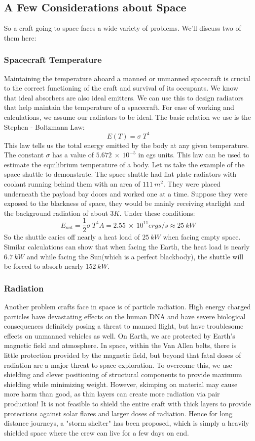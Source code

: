 \documentclass[12pt, letterpaper]{article}
\begin{document}
\subsection{A Few Considerations about Space}
So a craft going to space faces a wide variety of problems. We'll discuss two of them here:

\subsubsection{Spacecraft Temperature}
Maintaining the temperature aboard a manned or unmanned spacecraft is crucial to the correct functioning of the craft and survival of its occupants. We know that ideal absorbers are also ideal emitters. We can use this to design radiators that help maintain the temperature of a spacecraft. For ease of working and calculations, we assume our radiators to be ideal. The basic relation we use is the Stephen - Boltzmann Law:
\[
	E(T) = \sigma \:T^4 
\]
This law tells us the total energy emitted by the body at any given temperature. The constant $\sigma$ has a value of $5.672 \: \times \: 10^{-5} $ in cgs units. This law can be used to estimate the equilibrium temperature of a body. Let us take the example of the space shuttle to demonstrate. The space shuttle had flat plate radiators with coolant running behind them with an area of $111\: m^2$.
They were placed underneath the payload bay doors and worked one at a time. Suppose they were exposed to the blackness of space, they would be mainly receiving starlight and the background radiation of about $3K$. Under these conditions:
\[
	E_{out} = \frac{1}{2}\sigma \:T^4 A= 2.55\: \times \: 10^{11} ergs/s \approx 25\:kW
\] 
So the shuttle caries off nearly a heat load of $25\:kW$ when facing empty space. Similar calculations can show that when facing the Earth, the heat load is nearly $6.7\:kW$ and while facing the Sun(which is a perfect blackbody), the shuttle will be forced to absorb nearly $152\:kW$.

\subsubsection{Radiation}

Another problem crafts face in space is of particle radiation. High energy charged particles have devastating effects on the human DNA and have severe biological consequences definitely posing a threat to manned flight, but have troublesome effects on unmanned vehicles as well. On Earth, we are protected by Earth's magnetic field and atmosphere. In space, within the Van Allen belts, there is little protection provided by the magnetic field, but beyond that fatal doses of radiation are a major threat to space exploration. To overcome this, we use shielding and clever positioning of structural components to provide maximum shielding while minimizing weight. However, skimping on material may cause more harm than good, as thin layers can create more radiation via pair production! It is not feasible to shield the entire craft with thick layers to provide protections against solar flares and larger doses of radiation. Hence for long distance journeys, a "storm shelter" has been proposed, which is simply a heavily shielded space where the crew can live for a few days on end. 
\end{document}
